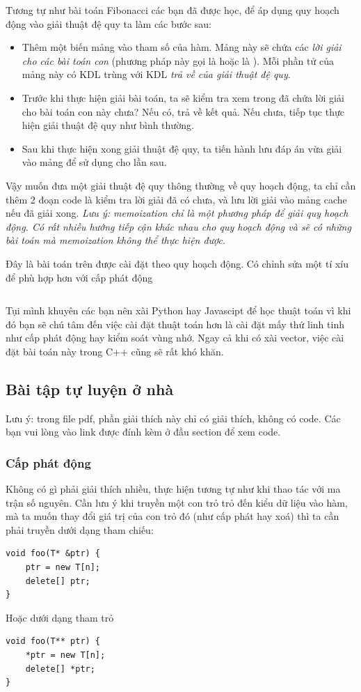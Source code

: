 \documentclass[main.tex]{subfiles}
\begin{document}
Tương tự như bài toán Fibonacci các bạn đã được học, để áp dụng quy hoạch động vào giải thuật đệ quy ta làm các bước sau:
\begin{itemize}
    \item Thêm một biến mảng vào tham số của hàm. Mảng này sẽ chứa các \textit{lời giải cho các bài toán con} (phương pháp này gọi là  hoặc là ). Mỗi phần tử của mảng này có KDL trùng với KDL \textit{trả về của giải thuật đệ quy}.
    \item Trước khi thực hiện giải bài toán, ta sẽ kiểm tra xem trong  đã chứa lời giải cho bài toán con này chưa? Nếu có, trả về kết quả. Nếu chưa, tiếp tục thực hiện giải thuật đệ quy như bình thường.
    \item Sau khi thực hiện xong giải thuật đệ quy, ta tiến hành lưu đáp án vừa giải vào mảng  để sử dụng cho lần sau.
\end{itemize}
Vậy muốn đưa một giải thuật đệ quy thông thường về quy hoạch động, ta chỉ cần thêm 2 đoạn code là kiểm tra lời giải đã có chưa, và lưu lời giải vào mảng \code cache nếu đã giải xong.
\textit{Lưu ý: memoization chỉ là một phương pháp để giải quy hoạch động. Có rất nhiều hướng tiếp cận khác nhau cho quy hoạch động và sẽ có những bài toán mà memoization không thể thực hiện được}.

Đây là bài toán trên được cài đặt theo quy hoạch động. Có chỉnh sửa một tí xíu để phù hợp hơn với cấp phát động
\inputminted[linenos,breaklines]{cpp}{answer_sources/QuyHoachDong_ToiUu.cpp}

{\scriptsize Tụi mình khuyên các bạn nên xài Python hay Javascipt để học thuật toán vì khi đó bạn sẽ chú tâm đến việc cài đặt thuật toán hơn là cài đặt mấy thứ linh tinh như cấp phát động hay kiểm soát vùng nhớ. Ngay cả khi có xài vector, việc cài đặt bài toán này trong C++ cũng sẽ rất khó khăn}.



\subsection{Bài tập tự luyện ở nhà}
Lưu ý: trong file pdf, phần giải thích này chỉ có giải thích, không có code. Các bạn vui lòng vào link được đính kèm ở đầu section để xem code.
\subsubsection{Cấp phát động}
Không có gì phải giải thích nhiều, thực hiện tương tự như khi thao tác với ma trận số nguyên.
Cần lưu ý khi truyền một con trỏ trỏ đến kiểu dữ liệu  vào hàm, mà ta muốn thay đổi giá trị của con trỏ đó (như cấp phát hay xoá) thì ta cần phải truyền dưới dạng tham chiếu: 
\begin{verbatim}
void foo(T* &ptr) {
    ptr = new T[n];
    delete[] ptr;
}
\end{verbatim}
Hoặc dưới dạng tham trỏ
\begin{verbatim}
void foo(T** ptr) {
    *ptr = new T[n];
    delete[] *ptr;
}
\end{verbatim}
\end{document}
